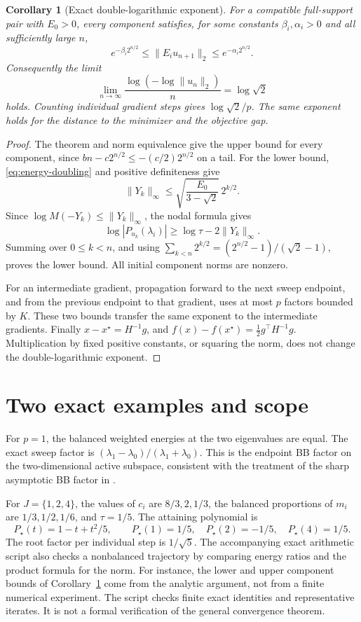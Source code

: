 \documentclass[11pt,a4paper]{article}
\newtheorem{corollary}[theorem]{Corollary}
\numberwithin{equation}{section}
\begin{document}
\begin{corollary}[Exact double-logarithmic exponent]\label{cor:exponent}
For a compatible full-support pair with \(E_0>0\), every component
satisfies, for some constants \(\beta_i,\alpha_i>0\) and all sufficiently
large \(n\),
\[
 e^{-\beta_i2^{n/2}}\le \|E_i u_{n+1}\|_2
                   \le e^{-\alpha_i2^{n/2}}.
\]
Consequently the limit
\[
 \lim_{n\to\infty}
 \frac{\log(-\log\|u_n\|_2)}{n}
 =\log\sqrt2
\]
holds. Counting individual gradient steps gives
\(\log\sqrt2/p\). The same exponent holds for the distance to the
minimizer and the objective gap.
\end{corollary}
\begin{proof}
The theorem and norm equivalence give the upper bound for every
component, since \(bn-c2^{n/2}\le-(c/2)2^{n/2}\) on a tail.
For the lower bound, \eqref{eq:energy-doubling} and positive
definiteness give
\[
 \|Y_k\|_\infty\le
 \sqrt{\frac{E_0}{3-\sqrt2}}\,2^{k/2}.
\]
Since \(\log M(-Y_k)\le\|Y_k\|_\infty\), the nodal formula gives
\[
 \log|P_{u_k}(\lambda_i)|
 \ge\log\tau-2\|Y_k\|_\infty .
\]
Summing over \(0\le k<n\), and using
\(\sum_{k<n}2^{k/2}=(2^{n/2}-1)/(\sqrt2-1)\), proves the
lower bound. All initial component norms are nonzero.

For an intermediate gradient, propagation forward to the next
sweep endpoint, and from the previous endpoint to that gradient,
uses at most \(p\) factors bounded by \(K\). These two bounds
transfer the same exponent to the intermediate gradients.
Finally \(x-x^\star=H^{-1}g\), and
\(f(x)-f(x^\star)=\tfrac12g^\top H^{-1}g\). Multiplication by
fixed positive constants, or squaring the norm, does not change
the double-logarithmic exponent.
\end{proof}

\section{Two exact examples and scope}

For \(p=1\), the balanced weighted energies at the two eigenvalues are equal. The exact sweep factor is \((\lambda_1-\lambda_0)/(\lambda_1+\lambda_0)\). This is the endpoint BB factor on the two-dimensional active subspace, consistent with the treatment of the sharp asymptotic BB factor in \cite{BBsharp}.

For \(J=\{1,2,4\}\), the values of \(c_i\) are \(8/3,2,1/3\), the balanced proportions of \(m_i\) are \(1/3,1/2,1/6\), and \(\tau=1/5\). The attaining polynomial is
\[
 P_\star(t)=1-t+t^2/5,\qquad
 P_\star(1)=1/5,\quad P_\star(2)=-1/5,\quad P_\star(4)=1/5.
\]
The root factor per individual step is \(1/\sqrt5\). The accompanying exact arithmetic script also checks a nonbalanced trajectory by comparing energy ratios and the product formula for the norm. For instance, the lower and upper component bounds of
Corollary~\ref{cor:exponent} come from the analytic argument, not from
a finite numerical experiment. The script checks finite exact
identities and representative iterates. It is not a formal
verification of the general convergence theorem.
\end{document}
